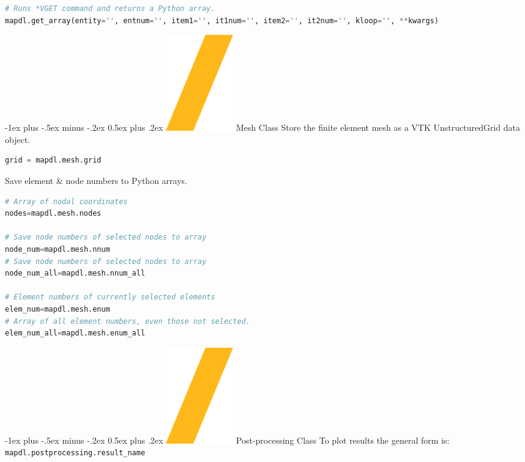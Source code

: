 \documentclass[9pt,landscape]{article}
\makeatletter
\renewcommand{\section}{\@startsection{section}{1}{0mm}%
                                {-1ex plus -.5ex minus -.2ex}%
                                {0.5ex plus .2ex}%
                                {\normalfont\large\bfseries}}
\def\code#1{\texttt{#1}}
\makeatother
\begin{document}
\begin{multicols}{3}
\begin{lstlisting}[language=Python]
# Runs *VGET command and returns a Python array.
mapdl.get_array(entity='', entnum='', item1='', it1num='', item2='', it2num='', kloop='', **kwargs)
\end{lstlisting}
\vfill

\section{\includegraphics[height=\fontcharht\font`\S]{slash.png} Mesh Class}
Store the finite element mesh as a VTK UnstructuredGrid data object.
\begin{lstlisting}[language=Python]
grid = mapdl.mesh.grid
\end{lstlisting}

Save element \& node numbers to Python arrays.
\begin{lstlisting}[language=Python]
# Array of nodal coordinates
nodes=mapdl.mesh.nodes

# Save node numbers of selected nodes to array
node_num=mapdl.mesh.nnum
# Save node numbers of selected nodes to array
node_num_all=mapdl.mesh.nnum_all

# Element numbers of currently selected elements
elem_num=mapdl.mesh.enum
# Array of all element numbers, even those not selected.
elem_num_all=mapdl.mesh.enum_all
\end{lstlisting}
\vfill

\columnbreak

\section{\includegraphics[height=\fontcharht\font`\S]{slash.png} Post-processing Class}
To plot results the general form is: \code{mapdl.postprocessing.result\_name}


\end{multicols}
\end{document}
